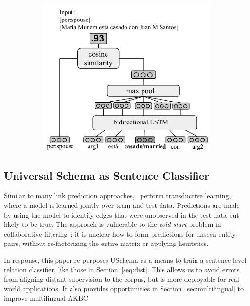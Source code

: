 \begin{figure}[h]
\begin{subfigure}{.4\textwidth}
  \includegraphics[scale=.75]{model-score}
\end{subfigure}
\end{figure}

\subsection{Universal Schema as Sentence Classifier \label{sec:uschema}}
Similar to many link prediction approaches,~\citep{limin} perform transductive learning, where a model is learned jointly over train and test data. Predictions are made by using the model to identify edges that were unobserved in the test data but likely to be true. The approach is vulnerable to the \emph{cold start} problem in collaborative filtering~\citep{schein2002methods}: it is unclear how to form predictions for unseen entity pairs, without re-factorizing the entire matrix or applying heuristics.

In response, this paper re-purposes USchema as a means to train a sentence-level relation classifier, like those in Section~\ref{seq:dist}. This allows us to avoid errors from aligning distant supervision to the corpus, but is more deployable for real world applications. It also provides opportunities in Section~\ref{sec:multilingual} to improve multilingual AKBC.

